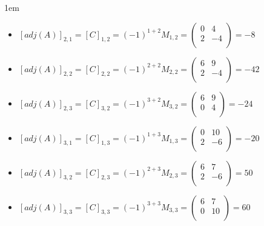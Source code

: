 \documentclass[12pt, fleqn]{article}                             %
\newenvironment{SmallIndentation}[1][0.75em]                    %
        {\begin{adjustwidth}{#1}{}\begin{footnotesize}}             %
        {\end{footnotesize}\end{adjustwidth}}                       %
\theoremstyle{break}                                            %
\newcommand{\pVector}[1]                                        %
        { \ensuremath{\begin{pmatrix}#1\end{pmatrix}} }             %
\begin{document}
\begin{itemize}
\begin{SmallIndentation}[1em]
\begin{itemize}
                    \item
                        $[adj(A)]_{2, 1} 
                            = [C]_{1, 2} 
                            = (-1)^{1+2} M_{1, 2}
                            = \pVector{
                                0 & 4  \\
                                2 & -4 \\
                            }
                            = -8$

                    \item
                        $[adj(A)]_{2, 2} 
                            = [C]_{2, 2} 
                            = (-1)^{2+2} M_{2, 2}
                            = \pVector{
                                6 & 9  \\ 
                                2 & -4 \\
                            }
                            = -42$

                    \item
                        $[adj(A)]_{2, 3} 
                            = [C]_{3, 2} 
                            = (-1)^{3+2} M_{3, 2}
                            = \pVector{
                                6 & 9  \\ 
                                0 & 4  \\
                            }
                            = -24$

                    \item
                        $[adj(A)]_{3, 1} 
                            = [C]_{1, 3} 
                            = (-1)^{1+3} M_{1, 3}
                            = \pVector{
                                0 & 10  \\
                                2 & -6  \\
                            }
                            = -20$

                    \item
                        $[adj(A)]_{3, 2} 
                            = [C]_{2, 3} 
                            = (-1)^{2+3} M_{2, 3}
                            = \pVector{
                                6 & 7  \\ 
                                2 & -6 \\
                            }
                            = 50$

                    \item
                        $[adj(A)]_{3, 3} 
                            = [C]_{3, 3} 
                            = (-1)^{3+3} M_{3, 3}
                            = \pVector{
                                6 & 7   \\ 
                                0 & 10  \\
                            }
                            = 60$
                

\end{itemize}
\end{SmallIndentation}
\end{itemize}
\end{document}

